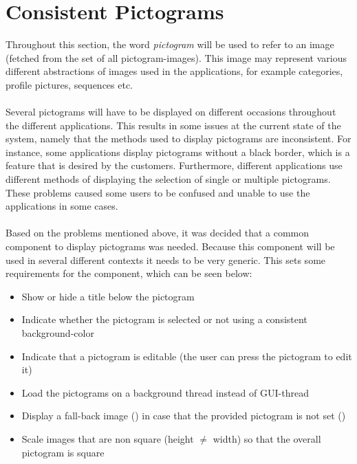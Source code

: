 
\section{Consistent Pictograms}
\label{sec:consistent_pictograms}

Throughout this section, the word \textit{pictogram} will be used to refer to an image (fetched from the set of all pictogram-images). This image may represent various different abstractions of images used in the \giraf applications, for example categories, profile pictures, sequences etc.
\\\\
Several pictograms will have to be displayed on different occasions throughout the different \giraf applications. This results in some issues at the current state of the system, namely that the methods used to display pictograms are inconsistent. For instance, some applications display pictograms without a black border, which is a feature that is desired by the customers. Furthermore, different applications use different methods of displaying the selection of single or multiple pictograms. These problems caused some users to be confused and unable to use the applications in some cases. 
\\\\
Based on the problems mentioned above, it was decided that a common component to display pictograms was needed. Because this component will be used in several different contexts it needs to be very generic. This sets some requirements for the component, which can be seen below:

\begin{itemize}
	\item Show or hide a title below the pictogram
	\item Indicate whether the pictogram is selected or not using a consistent background-color
	\item Indicate that a pictogram is editable (the user can press the pictogram to edit it)
	\item Load the pictograms on a background thread instead of GUI-thread 
	\item Display a fall-back image () in case that the provided pictogram is not set ()
	\item Scale images that are non square (height $\neq$ width) so that the overall pictogram is square
\end{itemize}

